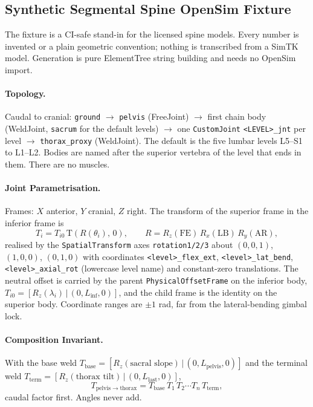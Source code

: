 \subsection{Synthetic Segmental Spine OpenSim Fixture}
\label{sec:spn-7a}

The fixture is a CI-safe stand-in for the licensed spine models. Every number
is invented or a plain geometric convention; nothing is transcribed from a
SimTK model. Generation is pure ElementTree string building and needs no
OpenSim import.

\paragraph{Topology.} Caudal to cranial:
\texttt{ground} $\to$ \texttt{pelvis} (FreeJoint) $\to$ first chain body
(WeldJoint, \texttt{sacrum} for the default levels) $\to$ one
\texttt{CustomJoint} \texttt{<LEVEL>\_jnt} per level $\to$ \texttt{thorax\_proxy}
(WeldJoint). The default is the five lumbar levels L5--S1 to L1--L2. Bodies are
named after the superior vertebra of the level that ends in them. There are no
muscles.

\paragraph{Joint Parametrisation.} Frames: $X$ anterior, $Y$ cranial, $Z$ right.
The transform of the superior frame in the inferior frame is
\begin{equation}
  T_i = T_{i0}\,\mathrm{T}\!\left(R(\theta_i),\,0\right),\qquad
  R = R_z(\mathrm{FE})\,R_x(\mathrm{LB})\,R_y(\mathrm{AR}),
\end{equation}
realised by the \texttt{SpatialTransform} axes \texttt{rotation1/2/3} about
$(0,0,1)$, $(1,0,0)$, $(0,1,0)$ with coordinates
\texttt{<level>\_flex\_ext}, \texttt{<level>\_lat\_bend},
\texttt{<level>\_axial\_rot} (lowercase level name) and constant-zero
translations. The neutral offset is carried by the parent
\texttt{PhysicalOffsetFrame} on the inferior body,
$T_{i0}=[R_z(\lambda_i)\,|\,(0,L_{\mathrm{inf}},0)]$, and the child frame is the
identity on the superior body. Coordinate ranges are $\pm 1$ rad, far from the
lateral-bending gimbal lock.

\paragraph{Composition Invariant.} With the base weld
$T_{\mathrm{base}}=[R_z(\text{sacral slope})\,|\,(0,L_{\mathrm{pelvis}},0)]$ and
the terminal weld $T_{\mathrm{term}}=[R_z(\text{thorax tilt})\,|\,(0,L_{\mathrm{last}},0)]$,
\begin{equation}
  T_{\mathrm{pelvis}\to\mathrm{thorax}}
  = T_{\mathrm{base}}\,T_1\,T_2\cdots T_n\,T_{\mathrm{term}},
\end{equation}
caudal factor first. Angles never add.

